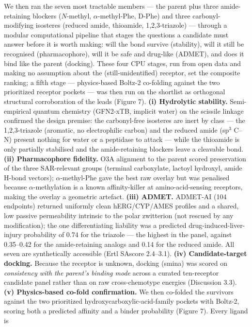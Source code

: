 \documentclass[11pt]{article}
\begin{document}
We then ran the seven most tractable members --- the parent plus three amide-retaining
blockers ($N$-methyl, $\alpha$-methyl-Phe, D-Phe) and three carbonyl-modifying isosteres
(reduced amide, thioamide, 1,2,3-triazole) --- through a modular computational pipeline
that stages the questions a candidate must answer before it is worth making: will the bond
survive (stability), will it still be recognised (pharmacophore), will it be safe and
drug-like (ADMET), and does it bind like the parent (docking). These four CPU stages, run
from open data and making no assumption about the (still-unidentified) receptor, set the
composite ranking; a fifth stage --- physics-based Boltz-2 co-folding against the two
prioritized receptor pockets --- was then run on the shortlist as orthogonal structural
corroboration of the leads (Figure 7). \textbf{(i) Hydrolytic stability.} Semi-empirical
quantum chemistry (GFN2-xTB, implicit water) on the scissile linkage confirmed the design
premise: the carbonyl-free isosteres are inert by class --- the 1,2,3-triazole (aromatic, no
electrophilic carbon) and the reduced amide (sp$^3$ C--N) present nothing for water or a
peptidase to attack --- while the thioamide is only partially stabilised and the
amide-retaining blockers leave a cleavable bond. \textbf{(ii) Pharmacophore fidelity.} O3A
alignment to the parent scored preservation of the three SAR-relevant groups (terminal
carboxylate, lactoyl hydroxyl, amide H-bond vectors); $\alpha$-methyl-Phe gave the best raw
overlay but was penalised because $\alpha$-methylation is a known affinity-killer at
amino-acid-sensing receptors, making the overlay a geometric artefact. \textbf{(iii) ADMET.}
ADMET-AI (104 endpoints) returned uniformly clean hERG/CYP/AMES profiles and a shared, low
passive permeability intrinsic to the polar zwitterion (not rescued by any modification); the
one differentiating liability was a predicted drug-induced-liver-injury probability of 0.74 for
the triazole --- the highest in the panel, against 0.35--0.42 for the amide-retaining analogs and 0.14 for the reduced amide. All seven are
synthetically accessible (Ertl SAscore 2.4--3.1). \textbf{(iv) Candidate-target docking.}
Because the receptor is unknown, docking (smina) was scored on \textit{consistency with the
parent's binding mode} across a curated ten-receptor candidate panel rather than on raw
cross-chemotype energies (Discussion 3.3). \textbf{(v) Physics-based co-fold confirmation.} We then
co-folded the survivors against the two prioritized hydroxycarboxylic-acid-family pockets with
Boltz-2, scoring both a predicted affinity and a binder probability (Figure 7). Every ligand is
\end{document}
